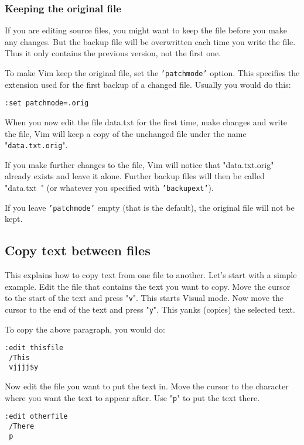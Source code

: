 \subsubsection{Keeping the original file}
If you are editing source files, you might want to keep the file before you make any changes.
But the backup file will be overwritten each time you write the file.
Thus it only contains the previous version, not the first one.

To make Vim keep the original file, set the \texttt{'patchmode'} option.
This specifies the extension used for the first backup of a changed file.
Usually you would do this:

 \begin{Verbatim}[samepage=true]
 :set patchmode=.orig
 \end{Verbatim}

When you now edit the file data.txt for the first time, make changes and write the file, Vim will keep a copy of the unchanged file under the name "\texttt{data.txt.orig}".

If you make further changes to the file, Vim will notice that "data.txt.orig" already exists and leave it alone.
Further backup files will then be called "data.txt~" (or whatever you specified with \texttt{'backupext'}).

If you leave \texttt{'patchmode'} empty (that is the default), the original file will not be kept.

\subsection{Copy text between files}
This explains how to copy text from one file to another.
Let's start with a simple example.
Edit the file that contains the text you want to copy.
Move the cursor to the start of the text and press "\texttt{v}".
This starts Visual mode.
Now move the cursor to the end of the text and press "\texttt{y}".
This yanks (copies) the selected text.

To copy the above paragraph, you would do:

 \begin{Verbatim}[samepage=true]
 :edit thisfile
 /This
 vjjjj$y
 \end{Verbatim}

Now edit the file you want to put the text in.
Move the cursor to the character where you want the text to appear after.
Use "\texttt{p}" to put the text there.

 \begin{Verbatim}[samepage=true]
 :edit otherfile
 /There
 p
 \end{Verbatim}

